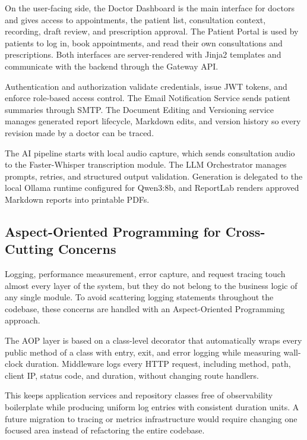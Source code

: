 On the user-facing side, the Doctor Dashboard is the main interface for doctors and gives access to appointments, the patient list, consultation context, recording, draft review, and prescription approval. The Patient Portal is used by patients to log in, book appointments, and read their own consultations and prescriptions. Both interfaces are server-rendered with Jinja2 templates and communicate with the backend through the Gateway API.

Authentication and authorization validate credentials, issue JWT tokens, and enforce role-based access control. The Email Notification Service sends patient summaries through SMTP. The Document Editing and Versioning service manages generated report lifecycle, Markdown edits, and version history so every revision made by a doctor can be traced.

The AI pipeline starts with local audio capture, which sends consultation audio to the Faster-Whisper transcription module. The LLM Orchestrator manages prompts, retries, and structured output validation. Generation is delegated to the local Ollama runtime configured for Qwen3:8b, and ReportLab renders approved Markdown reports into printable PDFs.

\subsection{Aspect-Oriented Programming for Cross-Cutting Concerns}
\label{subsec:aop-cross-cutting}

Logging, performance measurement, error capture, and request tracing touch almost every layer of the system, but they do not belong to the business logic of any single module. To avoid scattering logging statements throughout the codebase, these concerns are handled with an Aspect-Oriented Programming approach.

The AOP layer is based on a class-level decorator that automatically wraps every public method of a class with entry, exit, and error logging while measuring wall-clock duration. Middleware logs every HTTP request, including method, path, client IP, status code, and duration, without changing route handlers.

This keeps application services and repository classes free of observability boilerplate while producing uniform log entries with consistent duration units. A future migration to tracing or metrics infrastructure would require changing one focused area instead of refactoring the entire codebase.

